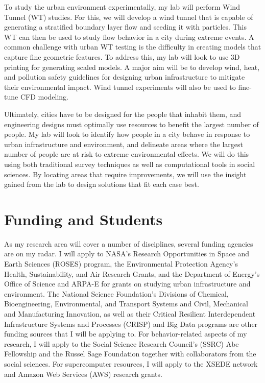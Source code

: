 \documentclass[12pt]{article}
\begin{document}
To study the urban environment experimentally, my lab will perform Wind Tunnel (WT) studies. For this, we will develop a wind tunnel that is capable of generating a stratified boundary layer flow and seeding it with particles. This WT can then be used to study flow behavior in a city during extreme events. A common challenge with urban WT testing is the difficulty in creating models that capture fine geometric features. To address this, my lab will look to use 3D printing for generating scaled models. A major aim will be to develop wind, heat, and pollution safety guidelines for designing urban infrastructure to mitigate their environmental impact. Wind tunnel experiments will also be used to fine-tune CFD modeling. 

Ultimately, cities have to be designed for the people that inhabit them, and engineering designs must optimally use resources to benefit the largest number of people. My lab will look to identify how people in a city behave in response to urban infrastructure and environment, and delineate areas where the largest number of people are at risk to extreme environmental effects. We will do this using both traditional survey techniques as well as computational tools in social sciences. By locating areas that require improvements, we will use the insight gained from the lab to design solutions that fit each case best. 

\section*{Funding and Students}
As my research area will cover a number of disciplines, several funding agencies are on my radar. I will apply to NASA's Research Opportunities in Space and Earth Sciences (ROSES) program, the Environmental Protection Agency's Health, Sustainability, and Air Research Grants, and the Department of Energy's Office of Science and ARPA-E for grants on studying urban infrastructure and environment. The National Science Foundation's Divisions of Chemical, Bioengineering, Environmental, and Transport Systems and Civil, Mechanical and Manufacturing Innovation, as well as their Critical Resilient Interdependent Infrastructure Systems and Processes (CRISP) and Big Data programs are other funding sources that I will be applying to. For behavior-related aspects of my research, I will apply to the Social Science Research Council's (SSRC) Abe Fellowship and the Russel Sage Foundation together with collaborators from the social sciences. For supercomputer resources, I will apply to the XSEDE network and Amazon Web Services (AWS) research grants. 
\end{document}
